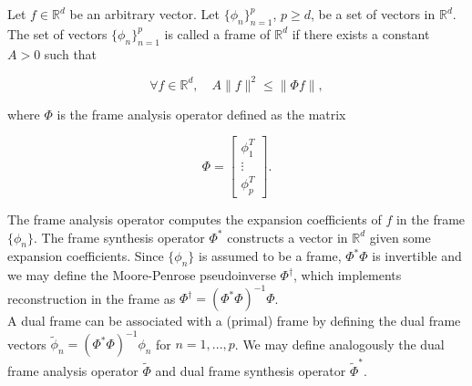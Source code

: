\documentclass[journal]{IEEEtran}
\newcommand{\reals}{\mathbb{R}}
\begin{document}
Let $f\in\reals^d$ be an arbitrary vector.  Let $\{\phi_n\}_{n=1}^p$, $p\ge d$, be a set of vectors in $\reals^d$.  The set of vectors $\{\phi_n\}_{n=1}^p$ is called a frame of $\reals^d$ if there exists a constant $A>0$ such that

\[ \forall f\in\reals^d, \quad A\|f\|^2 \le \|\Phi f\|, \] 

\noindent where $\Phi$ is the frame analysis operator defined as the matrix

\[ \Phi = \begin{bmatrix}\phi_1^T\\\vdots\\\phi_p^T\end{bmatrix}. \] 

   \noindent The frame analysis operator computes the expansion coefficients of $f$ in the frame $\{\phi_n\}$.  The frame synthesis operator $\Phi^\ast$ constructs a vector in $\reals^d$ given some expansion coefficients.  Since $\{\phi_n\}$ is assumed to be a frame, $\Phi^\ast\Phi$ is invertible and we may define the Moore-Penrose pseudoinverse $\Phi^\dagger$, which implements reconstruction in the frame as $\Phi^\dagger=\left(\Phi^\ast\Phi\right)^{-1}\Phi$.\\

   A dual frame can be associated with a (primal) frame by defining the dual frame vectors $\tilde{\phi}_n = \left(\Phi^\ast\Phi\right)^{-1}\phi_n$ for $n=1,...,p$.  We may define analogously the dual frame analysis operator $\tilde{\Phi}$ and dual frame synthesis operator $\tilde{\Phi}^\ast$.\\
\end{document}
